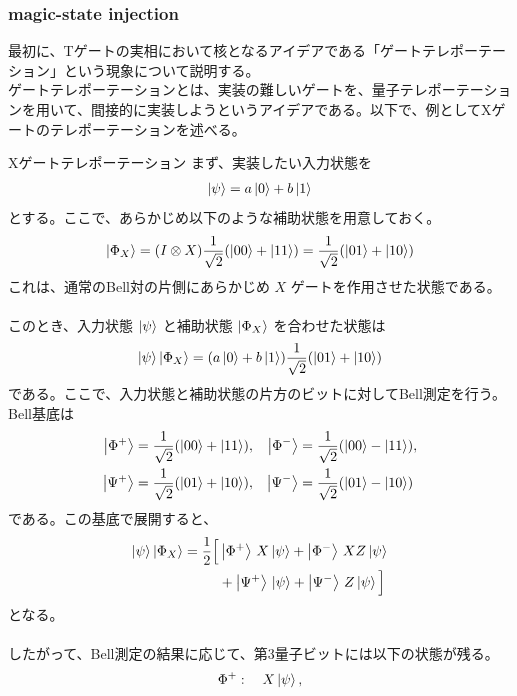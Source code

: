 \documentclass[a4paper,10.5pt]{article}
\numberwithin{equation}{section}
\begin{document}
\subsubsection{magic-state injection}
最初に、Tゲートの実相において核となるアイデアである「ゲートテレポーテーション」という現象について説明する。\\
ゲートテレポーテーションとは、実装の難しいゲートを、量子テレポーテーションを用いて、間接的に実装しようというアイデアである。以下で、例としてXゲートのテレポーテーションを述べる。
\begin{examplebox}{Xゲートテレポーテーション}
    まず、実装したい入力状態を
\begin{align*}
    \ket{\psi}=a\ket{0}+b\ket{1}
\end{align*}
とする。ここで、あらかじめ以下のような補助状態を用意しておく。
\begin{align*}
    \ket{\Phi_X}
    =
    (I\otimes X)\frac{1}{\sqrt{2}}(\ket{00}+\ket{11})
    =
    \frac{1}{\sqrt{2}}(\ket{01}+\ket{10})
\end{align*}
これは、通常のBell対の片側にあらかじめ \(X\) ゲートを作用させた状態である。\\
\\
このとき、入力状態 \(\ket{\psi}\) と補助状態 \(\ket{\Phi_X}\) を合わせた状態は
\begin{align*}
    \ket{\psi}\ket{\Phi_X}
    =
    (a\ket{0}+b\ket{1})
    \frac{1}{\sqrt{2}}(\ket{01}+\ket{10})
\end{align*}
である。ここで、入力状態と補助状態の片方のビットに対してBell測定を行う。Bell基底は
\begin{align*}
    \ket{\Phi^{+}}&=\frac{1}{\sqrt{2}}(\ket{00}+\ket{11}),&
    \ket{\Phi^{-}}&=\frac{1}{\sqrt{2}}(\ket{00}-\ket{11}),\\
    \ket{\Psi^{+}}&=\frac{1}{\sqrt{2}}(\ket{01}+\ket{10}),&
    \ket{\Psi^{-}}&=\frac{1}{\sqrt{2}}(\ket{01}-\ket{10})
\end{align*}
である。この基底で展開すると、
\begin{align*}
    \ket{\psi}\ket{\Phi_X}
    =
    \frac{1}{2}\Big[
    &\ket{\Phi^{+}}\,X\ket{\psi}
    +\ket{\Phi^{-}}\,XZ\ket{\psi} \\
    &+\ket{\Psi^{+}}\,\ket{\psi}
    +\ket{\Psi^{-}}\,Z\ket{\psi}
    \Big]
\end{align*}
となる。\\
\\
したがって、Bell測定の結果に応じて、第3量子ビットには以下の状態が残る。
\begin{align*}
    \Phi^{+}&:\quad X\ket{\psi},\\

\end{align*}
\end{examplebox}
\end{document}
